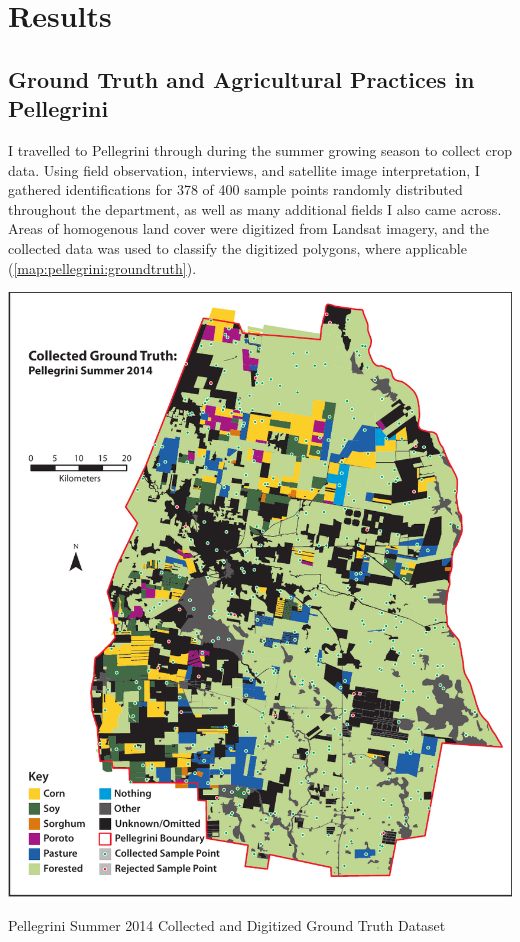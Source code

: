 \chapter{Results}
\label{results}

\section{Ground Truth and Agricultural Practices in Pellegrini}

I travelled to Pellegrini  through  during the summer growing season to collect crop data. Using field observation, interviews, and satellite image interpretation, I gathered identifications for 378 of 400 sample points randomly distributed throughout the department, as well as many additional fields I also came across. Areas of homogenous land cover were digitized from Landsat imagery, and the collected data was used to classify the digitized polygons, where applicable (\autoref{map:pellegrini:groundtruth}).
\begin{ssfigure}
  \centering
  \includegraphics[width=\textwidth]{Graphics/collecteddata.pdf}
  \caption{Pellegrini Summer 2014 Collected and Digitized Ground Truth Dataset}
  \label{map:pellegrini:groundtruth}
\end{ssfigure}
